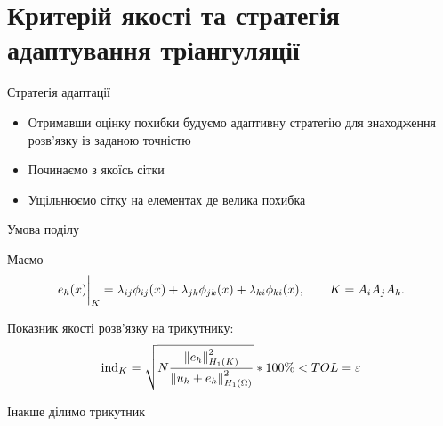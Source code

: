 
\section{Критерій якості та стратегія адаптування тріангуляції}
\frame{\sectionpage}

\begin{frame}{Стратегія адаптації}

	\begin{itemize}
		\item Отримавши оцінку похибки будуємо адаптивну стратегію для знаходження розв'язку із заданою точністю
		\item Починаємо з якоїсь сітки
		\item Ущільнюємо сітку на елементах де велика похибка
	\end{itemize}

\end{frame}

\begin{frame}{Умова поділу}

	Маємо
	\begin{equation}\label{eq:error_element}
		e_h(x)\bigg|_K = \lambda_{ij} \phi_{ij}(x)+\lambda_{jk} \phi_{jk}(x)+\lambda_{ki} \phi_{ki}(x), \qquad K = A_iA_jA_k.
	\end{equation}

	Показник якості розв'язку на трикутнику:
	\begin{equation}\label{eq:error_indicator}
		\text{ind}_K = \sqrt{N \frac
				{\norm{e_h}^2_{H_1(K)}}
				{\norm{u_h+e_h}^2_{H_1(\Omega)}}
		}*100\% < TOL = \varepsilon %
	\end{equation}

	Інакше ділимо трикутник 

\end{frame}
